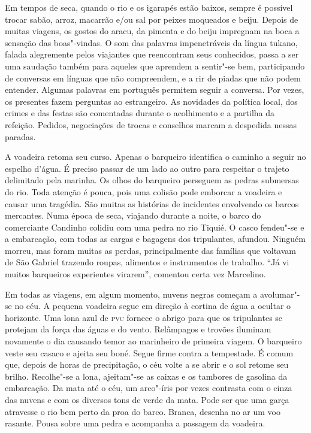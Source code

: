 Em tempos de seca, quando o rio e os igarapés estão baixos, sempre é
possível trocar sabão, arroz, macarrão e/ou sal por peixes moqueados e
beiju. Depois de muitas viagens, os gostos do aracu, da pimenta e do
beiju impregnam na boca a sensação das boas"-vindas. O som das palavras
impenetráveis da língua tukano, falada alegremente pelos viajantes que
reencontram seus conhecidos, passa a ser uma saudação também para
aqueles que aprendem a sentir"-se bem, participando de conversas em
línguas que não compreendem, e a rir de piadas que não podem entender.
Algumas palavras em português permitem seguir a conversa. Por vezes, os
presentes fazem perguntas ao estrangeiro. As novidades da política
local, dos crimes e das festas são comentadas durante o acolhimento e a
partilha da refeição. Pedidos, negociações de trocas e conselhos marcam
a despedida nessas paradas.

A voadeira retoma seu curso. Apenas o barqueiro identifica o caminho a
seguir no espelho d'água. É preciso passar de um lado ao outro para
respeitar o trajeto delimitado pela marinha. Os olhos do barqueiro
perseguem as pedras submersas do rio. Toda atenção é pouca, pois uma
colisão pode emborcar a voadeira e causar uma tragédia. São muitas as
histórias de incidentes envolvendo os barcos mercantes. Numa época de
seca, viajando durante a noite, o barco do comerciante Candinho colidiu
com uma pedra no rio Tiquié. O casco fendeu"-se e a embarcação, com todas
as cargas e bagagens dos tripulantes, afundou. Ninguém morreu, mas foram
muitas as perdas, principalmente das famílias que voltavam de São
Gabriel trazendo roupas, alimentos e instrumentos de trabalho. ``Já vi
muitos barqueiros experientes virarem'', comentou certa vez Marcelino.

Em todas as viagens, em algum momento, nuvens negras começam a
avolumar"-se no céu. A pequena voadeira segue em direção à cortina de
água a ocultar o horizonte. Uma lona azul de {\textsc{pvc}} fornece o abrigo para
que os tripulantes se protejam da força das águas e do vento. Relâmpagos
e trovões iluminam novamente o dia causando temor ao marinheiro de
primeira viagem. O barqueiro veste seu casaco e ajeita seu boné. Segue
firme contra a tempestade. É comum que, depois de horas de precipitação,
o céu volte a se abrir e o sol retome seu brilho. Recolhe"-se a lona,
ajeitam"-se as caixas e os tambores de gasolina da embarcação. Da mata
até o céu, um arco"-íris por vezes contrasta com o cinza das nuvens e com
os diversos tons de verde da mata. Pode ser que uma garça atravesse o
rio bem perto da proa do barco. Branca, desenha no ar um voo rasante.
Pousa sobre uma pedra e acompanha a passagem da voadeira.

